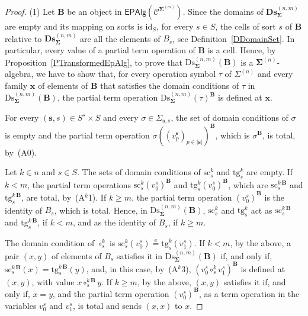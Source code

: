 \documentclass[a4paper, reqno]{amsbook}
\newcommand{\bb}[1]{\ensuremath{\lvert #1 \rvert}}
\newcommand{\sig}[1]{\mathbf{#1}}             %
\newcommand{\spec}[1]{\boldsymbol{\mathcal{#1}}} %
\newcommand{\eeq}{\overset{\mathrm e}{=}}      %
\newcommand{\id}{\mathrm{id}}
\newcommand{\src}{\mathrm{sc}}
\newcommand{\tgt}{\mathrm{tg}}
\newcommand{\Ds}{\mathrm{Ds}}
\newcommand{\bDs}{\mathbf{Ds}}
\theoremstyle{plain}
\theoremstyle{definition}
\begin{document}
\begin{proof}

(1) Let $\mathbf{B}$ be an object in $\mathsf{EPAlg}(\spec{C}^{\sig{\Sigma}^{(m)}})$.
Since the domains of $\bDs^{(n,m)}_{\sig{\Sigma}}$ are empty and its mapping on sorts is $\id_{S}$, for every $s\in S$, the cells of sort $s$ of $\mathbf{B}$ relative to $\bDs^{(n,m)}_{\sig{\Sigma}}$ are all the elements of $B_{s}$, see Definition~\ref{DDomainSet}.
In particular, every value of a partial term operation of $\mathbf{B}$ is a cell.
Hence, by Proposition~\ref{PTransformedEpAlg}, to prove that $\Ds^{(n,m)}_{\sig{\Sigma}}(\mathbf{B})$ is a $\sig{\Sigma}^{(n)}$-algebra, we have to show that, for every operation symbol $\tau$ of $\Sigma^{(n)}$ and every family $\mathbf{x}$ of elements of $\mathbf{B}$ that satisfies the domain conditions of $\tau$ in $\Ds^{(n,m)}_{\sig{\Sigma}}(\mathbf{B})$, the partial term operation $\Ds^{(n,m)}_{\sig{\Sigma}}(\tau)^{\mathbf{B}}$ is defined at $\mathbf{x}$.

For every $(\mathbf{s},s)\in S^{\star}\times S$ and every $\sigma\in\Sigma_{\mathbf{s},s}$, the set of domain conditions of $\sigma$ is empty and the partial term operation $\sigma((v^{\mathbf{s}}_{p})_{p\in\bb{\mathbf{s}}})^{\mathbf{B}}$, which is $\sigma^{\mathbf{B}}$, is total, by~(A0).

Let $k\in n$ and $s\in S$.
The sets of domain conditions of $\src^{k}_{s}$ and $\tgt^{k}_{s}$ are empty.
If $k<m$, the partial term operations $\src^{k}_{s}(v^{s}_{0})^{\mathbf{B}}$ and $\tgt^{k}_{s}(v^{s}_{0})^{\mathbf{B}}$, which are $\src^{k\,\mathbf{B}}_{s}$ and $\tgt^{k\,\mathbf{B}}_{s}$, are total, by~(A$^{k}$1).
If $k\geq m$, the partial term operation $(v^{s}_{0})^{\mathbf{B}}$ is the identity of $B_{s}$, which is total.
Hence, in $\Ds^{(n,m)}_{\sig{\Sigma}}(\mathbf{B})$, $\src^{k}_{s}$ and $\tgt^{k}_{s}$ act as $\src^{k\,\mathbf{B}}_{s}$ and $\tgt^{k\,\mathbf{B}}_{s}$, if $k<m$, and as the identity of $B_{s}$, if $k\geq m$.

The domain condition of $\circ^{k}_{s}$ is $\src^{k}_{s}(v^{s}_{0})\eeq\tgt^{k}_{s}(v^{s}_{1})$.
If $k<m$, by the above, a pair $(x,y)$ of elements of $B_{s}$ satisfies it in $\Ds^{(n,m)}_{\sig{\Sigma}}(\mathbf{B})$ if, and only if, $\src^{k\,\mathbf{B}}_{s}(x)=\tgt^{k\,\mathbf{B}}_{s}(y)$, and, in this case, by~(A$^{k}$3), $(v^{s}_{0}\circ^{k}_{s}v^{s}_{1})^{\mathbf{B}}$ is defined at $(x,y)$, with value $x\circ^{k\,\mathbf{B}}_{s}y$.
If $k\geq m$, by the above, $(x,y)$ satisfies it if, and only if, $x=y$, and the partial term operation $(v^{s}_{0})^{\mathbf{B}}$, as a term operation in the variables $v^{s}_{0}$ and $v^{s}_{1}$, is total and sends $(x,x)$ to $x$.


\end{proof}
\end{document}
